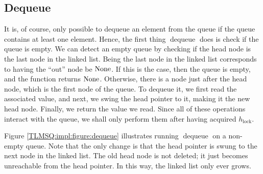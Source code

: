\documentclass[a4paper, 10pt]{report}
\theoremstyle{definition}
\newcommand{\dequeue}{\operatorname{dequeue}}
\newcommand{\Hlock}{h_{\mathrm{lock}}}
\begin{document}
\subsection{Dequeue}
\label{TLMSQ:implementation:sub:dequeue}

It is, of course, only possible to dequeue an element from the queue if the queue contains at least one element. Hence, the first thing $\dequeue$ does is check if the queue is empty. We can detect an empty queue by checking if the head node is the last node in the linked list. Being the last node in the linked list corresponds to having the ``out'' node be $\operatorname{None}$. If this is the case, then the queue is empty, and the function returns $\operatorname{None}$. Otherwise, there is a node just after the head node, which is the first node of the queue. To dequeue it, we first read the associated value, and next, we swing the head pointer to it, making it the new head node. Finally, we return the value we read. Since all of these operations interact with the queue, we shall only perform them after having acquired $\Hlock$.

Figure \ref{TLMSQ:impl:figure:dequeue} illustrates running $\dequeue$ on a non-empty queue. Note that the only change is that the head pointer is swung to the next node in the linked list. The old head node is not deleted; it just becomes unreachable from the head pointer. In this way, the linked list only ever grows.
\end{document}
